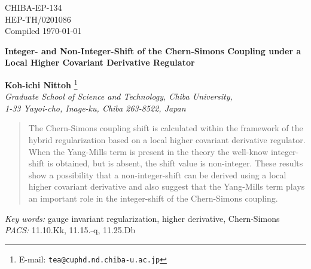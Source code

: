\documentclass[a4paper,12pt]{article}
\begin{document}
\begin{flushright}			%
       CHIBA-EP-134\\
       HEP-TH/0201086\\
       \tiny{Compiled \today}
\end{flushright}
\begin{center}

\renewcommand{\thefootnote}{\fnsymbol{footnote}}

{
\Large \sffamily \bfseries%
  {%
Integer- and Non-Integer-Shift of
the Chern-Simons Coupling under
a Local Higher Covariant Derivative Regulator
  }
}

\vspace{18pt}
{\large \sffamily \bfseries {Koh-ichi Nittoh}}
      \footnote{E-mail: \texttt{tea@cuphd.nd.chiba-u.ac.jp}}
\\
{\small\it
Graduate School of Science and Technology, Chiba University,\\
1-33 Yayoi-cho, Inage-ku, Chiba 263-8522, Japan}\\
\end{center}\vspace{18pt}
\begin{abstract}
The Chern-Simons coupling shift is calculated
within the framework of the hybrid regularization
based on a local higher covariant derivative regulator.
%
When the Yang-Mills term is present in the theory
the well-know integer-shift is obtained,
but is absent, the shift value is non-integer.
%
These results
show a possibility
that a non-integer-shift can be derived
using a local higher covariant derivative
and also suggest that the Yang-Mills term plays an important role
in the integer-shift of the Chern-Simons coupling.
\end{abstract}
\vspace{12pt}
{
\noindent
\textit{Key words:}
gauge invariant regularization, higher derivative, Chern-Simons\\
\textit{PACS:}
11.10.Kk, 11.15.-q, 11.25.Db
}
\vspace{18pt}
\end{document}
